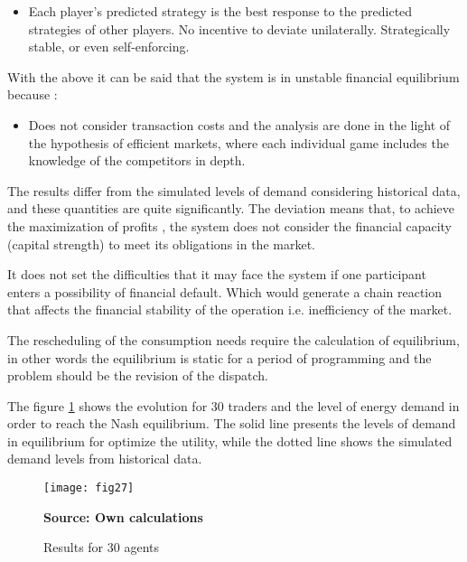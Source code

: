\documentclass[12pt]{book}
\begin{document}
\begin{itemize}

\item{Each player's predicted strategy is the best response to the predicted strategies of other players. No incentive to deviate unilaterally. Strategically stable, or even self-enforcing.} 

\end{itemize}

With the above it can be said that the system is in unstable financial equilibrium because \cite{buttler2013}: 
\begin{itemize}

\item{Does not consider transaction costs and the analysis are done in the light of the hypothesis of efficient markets, where each individual game includes the knowledge of the competitors in depth.} 

\end{itemize}

The results differ from the simulated levels of demand considering historical data, and these quantities are quite significantly. The deviation means that, to achieve the maximization of profits \cite{alos2003}, the system does not consider the financial capacity (capital strength) to meet its obligations in the market. 

It does not set the difficulties that it may face the system if one participant enters a possibility of financial default. Which would generate a chain reaction that affects the financial stability of the operation i.e. inefficiency of the market. 

The rescheduling of the consumption needs require the calculation of equilibrium, in other words the equilibrium is static for a period of programming and the problem should be the revision of the dispatch. 

The figure \ref{Fig 27} shows the evolution for 30 traders and the level of energy demand in order to reach the Nash equilibrium. The solid line presents the levels of demand in equilibrium for optimize the utility, while the dotted line shows the simulated demand levels from historical data. 

\begin{figure}  
\centering    
\texttt{[image: fig27]}  
\caption{Results for 30 agents}
\scriptsize 
\textbf{Source: Own calculations}
\captionsetup{justification=centering,margin=1cm}   
\label{Fig 27}
\end{figure}
\end{document}
